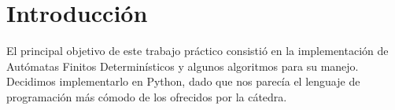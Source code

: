\section{Introducción}

\indent El principal objetivo de este trabajo práctico consistió en la implementación de Autómatas Finitos Determinísticos y algunos algoritmos para su manejo.\\
\indent Decidimos implementarlo en Python, dado que nos parecía el lenguaje de programación más cómodo de los ofrecidos por la cátedra.\\